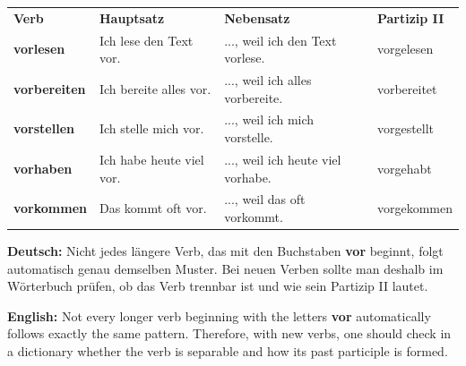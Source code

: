 \documentclass[a4paper,11pt]{article}
\newcommand{\GermanText}[1]{\textbf{Deutsch: }#1\par}
\newcommand{\EnglishText}[1]{{\small\color{SoftGray}\textbf{English: }#1\par}}
\begin{document}
        \begin{longtable}{>{\bfseries}p{3.1cm}p{4.5cm}p{4.5cm}p{3.1cm}}
            \rowcolor{HeaderBlueDark}
            \color{white}\textbf{Verb} &
            \color{white}\textbf{Hauptsatz} &
            \color{white}\textbf{Nebensatz} &
            \color{white}\textbf{Partizip II} \\
            vorlesen & Ich lese den Text vor. & ..., weil ich den Text vorlese. & vorgelesen \\
            vorbereiten & Ich bereite alles vor. & ..., weil ich alles vorbereite. & vorbereitet \\
            vorstellen & Ich stelle mich vor. & ..., weil ich mich vorstelle. & vorgestellt \\
            vorhaben & Ich habe heute viel vor. & ..., weil ich heute viel vorhabe. & vorgehabt \\
            vorkommen & Das kommt oft vor. & ..., weil das oft vorkommt. & vorgekommen \\
        \end{longtable}

        \begin{warningbox}
            \GermanText{Nicht jedes längere Verb, das mit den Buchstaben \textbf{vor} beginnt, folgt automatisch genau demselben Muster. Bei neuen Verben sollte man deshalb im Wörterbuch prüfen, ob das Verb trennbar ist und wie sein Partizip II lautet.}
            \EnglishText{Not every longer verb beginning with the letters \textbf{vor} automatically follows exactly the same pattern. Therefore, with new verbs, one should check in a dictionary whether the verb is separable and how its past participle is formed.}
        \end{warningbox}
\end{document}
